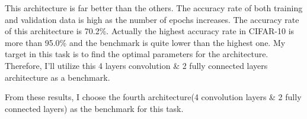 This architecture is far better than the others. The accuracy rate of both training and validation data is high as the number of epochs increases.
The accuracy rate of this architecture is 70.2\%. Actually the highest accuracy rate in CIFAR-10 is more than 95.0\% and the benchmark is quite lower than the highest one. My target in this task is to find the optimal parameters for the architecture. Therefore, I'll utilize this 4 layers convolution \& 2 fully connected layers architecture as a benchmark.


From these results, I choose the fourth architecture(4 convolution layers \& 2 fully connected layers) as the benchmark for this task.
